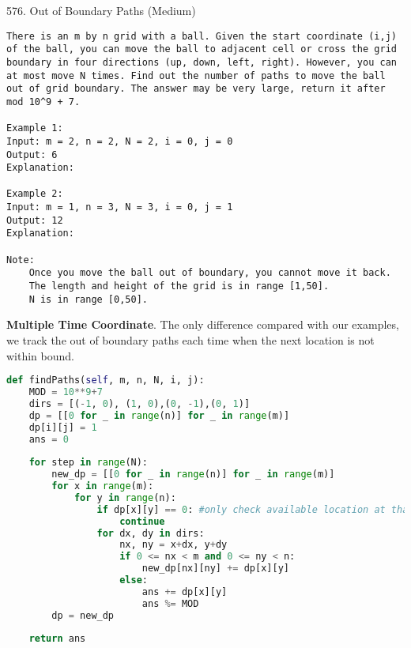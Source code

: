 \documentclass[../main.tex]{subfiles}
\begin{document}
576. Out of Boundary Paths (Medium)
\begin{lstlisting}
There is an m by n grid with a ball. Given the start coordinate (i,j) of the ball, you can move the ball to adjacent cell or cross the grid boundary in four directions (up, down, left, right). However, you can at most move N times. Find out the number of paths to move the ball out of grid boundary. The answer may be very large, return it after mod 10^9 + 7.

Example 1:
Input: m = 2, n = 2, N = 2, i = 0, j = 0
Output: 6
Explanation:

Example 2:
Input: m = 1, n = 3, N = 3, i = 0, j = 1
Output: 12
Explanation:

Note:
    Once you move the ball out of boundary, you cannot move it back.
    The length and height of the grid is in range [1,50].
    N is in range [0,50].
\end{lstlisting}
\textbf{Multiple Time Coordinate}. The only difference compared with our examples, we track the out of boundary paths each time when the next location is not within bound. 
\begin{lstlisting}[language=Python]
def findPaths(self, m, n, N, i, j):
    MOD = 10**9+7
    dirs = [(-1, 0), (1, 0),(0, -1),(0, 1)]
    dp = [[0 for _ in range(n)] for _ in range(m)]
    dp[i][j] = 1
    ans = 0
    
    for step in range(N):
        new_dp = [[0 for _ in range(n)] for _ in range(m)]
        for x in range(m):
            for y in range(n):
                if dp[x][y] == 0: #only check available location at that step
                    continue
                for dx, dy in dirs:
                    nx, ny = x+dx, y+dy
                    if 0 <= nx < m and 0 <= ny < n:
                        new_dp[nx][ny] += dp[x][y]
                    else:
                        ans += dp[x][y]
                        ans %= MOD
        dp = new_dp
    
    return ans
\end{lstlisting}
\end{document}
